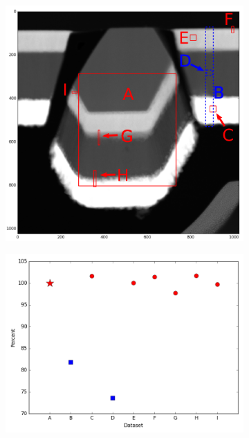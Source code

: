 \begin{figure}
	\begin{subfigure}{.5\textwidth}
		\centering
		\includegraphics[width=\linewidth]{"fig/nonheated-images-in-overview (correct)3"}
		\caption{}
		\label{fig:nonheated-images-in-overview}
	\end{subfigure}%
	\begin{subfigure}{.5\textwidth}
		\centering
		\includegraphics[width=\linewidth]{"fig/nonheated-matching-values"}
		\caption{}
		\label{fig:nonheated-matching-values}
	\end{subfigure}
\end{figure}

